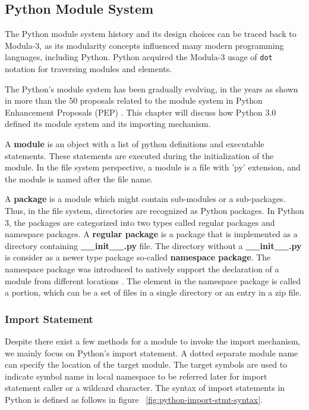
\subsection{Python Module System}

The Python module system history and its design choices can be traced back to Modula-3\cite{modula-3}, as its modularity concepts influenced many modern programming languages, including Python.
Python acquired the Modula-3 usage of \texttt{dot} notation for traversing modules and elements\cite{python-foreward-essay}.

The Python's module system has been gradually evolving, in the years as shown in more than the 50 proposals related to the module system in Python Enhancement Proposals (PEP) \cite{pep0}. This chapter will discuss how Python 3.0 defined its module system and its importing mechanism.

A \textbf{module} is an object with a list of python definitions and executable statements. These statements are executed during the initialization of the module. In the file system perspective, a module is a file with 'py' extension, and the module is named after the file name.

A \textbf{package} is a module which might contain sub-modules or a sub-packages.
Thus, in the file system, directories are recognized as Python packages.
In Python 3, the packages are categorized into two types called regular packages and namespace packages.
A \textbf{regular package} is a package that is implemented as a directory containing \textbf{\_\_init\_\_.py} file.
The directory without a \textbf{\_\_init\_\_.py} is consider as a newer type package so-called \textbf{namespace package}.
The namespace package was introduced to natively support the declaration of a module from different locations \cite{pep420}. The element in the namespace package is called a portion, which can be a set of files in a single directory or an entry in a zip file.

\subsubsection{Import Statement}

Despite there exist a few methods for a module to invoke the import mechanism, we mainly focus on Python's import statement.
A dotted separate module name can specify the location of the target module. The target symbols are used to indicate symbol name in local namespace to be referred later for import statement caller or a wildcard character.
The syntax of import statements in Python is defined as follows in figure ~\ref{fig:python-import-stmt-syntax}.

